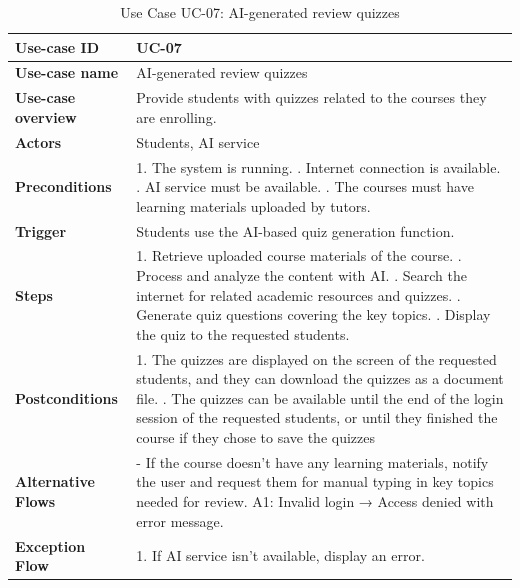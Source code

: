 \begin{table}[h!]
\centering
\begin{tabular}{|p{3cm}|p{11cm}|}
\hline
\textbf{Use-case ID} & UC-07 \\
\hline
\textbf{Use-case name} & AI-generated review quizzes \\
\hline
\textbf{Use-case overview} & Provide students with quizzes related to the courses they are enrolling. \\
\hline
\textbf{Actors} & Students, AI service \\
\hline
\textbf{Preconditions} & 
1. The system is running. \newline
2. Internet connection is available. \newline
3. AI service must be available. \newline
4. The courses must have learning materials uploaded by tutors. \\
\hline
\textbf{Trigger} & Students use the AI-based quiz generation function. \\
\hline
\textbf{Steps} & 
1. Retrieve uploaded course materials of the course. \newline
2. Process and analyze the content with AI. \newline
3. Search the internet for related academic resources and quizzes. \newline
4. Generate quiz questions covering the key topics. \newline
5. Display the quiz to the requested students. \\
\hline
\textbf{Postconditions} & 
1. The quizzes are displayed on the screen of the requested students, and they can download the quizzes as a document file. \newline
2. The quizzes can be available until the end of the login session of the requested students, or until they finished the course if they chose to save the quizzes \\
\hline
\textbf{Alternative Flows} & 
- If the course doesn't have any learning materials, notify the user and request them for manual typing in key topics needed for review.
A1: Invalid login → Access denied with error message. \\
\hline
\textbf{Exception Flow} & 
1. If AI service isn't available, display an error. \\
\hline
\end{tabular}
\caption{Use Case UC-07: AI-generated review quizzes}
\end{table}
